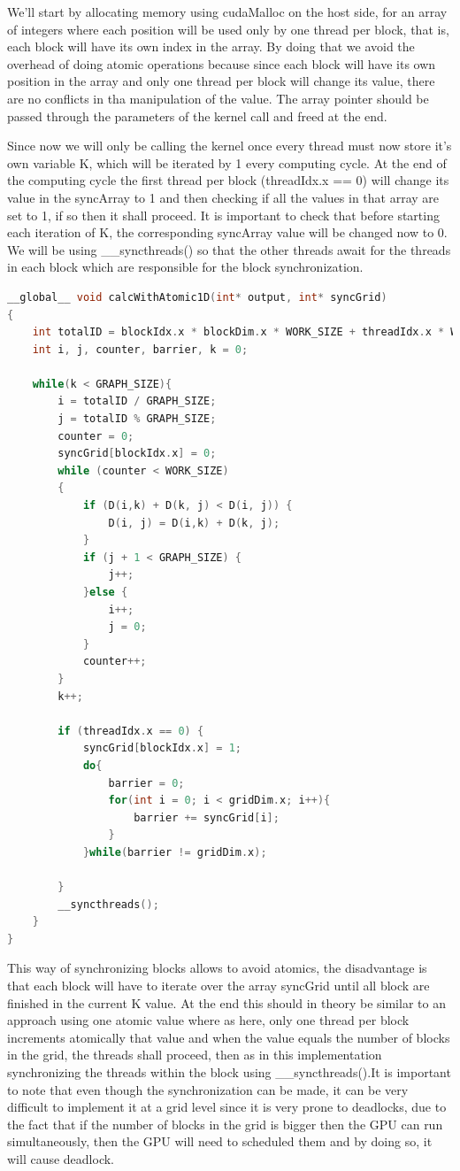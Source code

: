 \documentclass[conference]{IEEEtran}
\begin{document}
We'll start by allocating memory using cudaMalloc on the host side, for an array of integers where each position will be used only by one thread per block, that is, each block will have its own index in the array. By doing that we avoid the overhead of doing atomic operations because since each block will have its own position in the array and only one thread per block will change its value, there are no conflicts in tha manipulation of the value. The array pointer should be passed through the parameters of the kernel call and freed at the end.

Since now we will only be calling the kernel once every thread must now store it's own variable K, which will be iterated by 1 every computing cycle.  At the end of the computing cycle the first thread per block (threadIdx.x == 0) will change its value in the syncArray to 1 and then checking if all the values in that array are set to 1, if so then it shall proceed. It is important to check that before starting each iteration of K, the corresponding syncArray value will be changed now to 0.
We will be using \_\_syncthreads() so that the other threads await for the threads in each block which are responsible for the block synchronization.


\begin{lstlisting}[language=C++, caption=CUDA implementation with synchronization]
__global__ void calcWithAtomic1D(int* output, int* syncGrid)
{
	int totalID = blockIdx.x * blockDim.x * WORK_SIZE + threadIdx.x * WORK_SIZE;
	int i, j, counter, barrier, k = 0;

	while(k < GRAPH_SIZE){
		i = totalID / GRAPH_SIZE;
		j = totalID % GRAPH_SIZE;
		counter = 0;
		syncGrid[blockIdx.x] = 0;
		while (counter < WORK_SIZE)
		{
			if (D(i,k) + D(k, j) < D(i, j)) {
				D(i, j) = D(i,k) + D(k, j);
			}
			if (j + 1 < GRAPH_SIZE) {
				j++;
			}else {
				i++;
				j = 0;
			}
			counter++;
		}
		k++;

		if (threadIdx.x == 0) {
			syncGrid[blockIdx.x] = 1;
			do{
				barrier = 0;
				for(int i = 0; i < gridDim.x; i++){
					barrier += syncGrid[i];
				}
			}while(barrier != gridDim.x);
		
		}
		__syncthreads();
	}
}
\end{lstlisting}

This way of synchronizing blocks allows to avoid atomics, the disadvantage is that each block will have to iterate over the array syncGrid until all block are finished in the current K value. At the end this should in theory be similar to an approach using one atomic value where as here, only one thread per block increments atomically that value and when the value equals the number of blocks in the grid, the threads shall proceed, then as in this implementation synchronizing the threads within the block using \_\_syncthreads().It is important to note that even though the synchronization can be made, it can be very difficult to implement it at a grid level since it is very prone to deadlocks, due to the fact that if the number of blocks in the grid is bigger then the GPU can run simultaneously, then the GPU will need to scheduled them and by doing so, it will cause deadlock.
\end{document}
